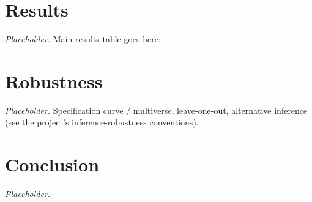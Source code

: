 \documentclass[12pt]{article}
\begin{document}
\section{Results}

\textit{Placeholder.} Main results table goes here:


\section{Robustness}

\textit{Placeholder.} Specification curve / multiverse, leave-one-out,
alternative inference (see the project's inference-robustness conventions).

\section{Conclusion}

\textit{Placeholder.}


\end{document}
